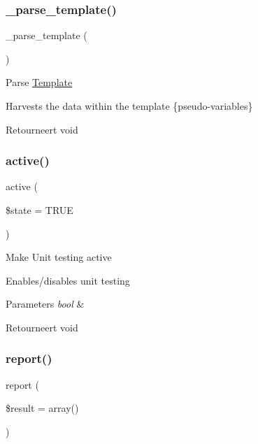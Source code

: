 \subsubsection{\texorpdfstring{\_parse\_template()}{\_parse\_template()}}
{\footnotesize\ttfamily \+\_\+parse\+\_\+template (\begin{DoxyParamCaption}{ }\end{DoxyParamCaption})\hspace{0.3cm}{\ttfamily [protected]}}

Parse \mbox{\hyperlink{class_template}{Template}}

Harvests the data within the template \{pseudo-\/variables\}

\begin{DoxyReturn}{Retourneert}
void 
\end{DoxyReturn}
\mbox{\label{class_c_i___unit__test_ac7b3030630fc7dd31513c75cf27c1a8a}} 
\subsubsection{\texorpdfstring{active()}{active()}}
{\footnotesize\ttfamily active (\begin{DoxyParamCaption}\item[{}]{\$state = {\ttfamily TRUE} }\end{DoxyParamCaption})}

Make Unit testing active

Enables/disables unit testing


\begin{DoxyParams}{Parameters}
{\em bool} & \\
\hline
\end{DoxyParams}
\begin{DoxyReturn}{Retourneert}
void 
\end{DoxyReturn}
\mbox{\label{class_c_i___unit__test_a339c46eabb709c1c492bc264c9634171}} 
\subsubsection{\texorpdfstring{report()}{report()}}
{\footnotesize\ttfamily report (\begin{DoxyParamCaption}\item[{}]{\$result = {\ttfamily array()} }\end{DoxyParamCaption})}

